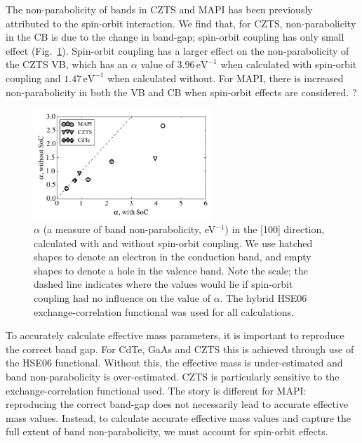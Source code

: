 The non-parabolicity of bands in CZTS\autocite{Ito2015} and MAPI\autocite{Brivio2014,Mosconi2017} has been previously attributed to the spin-orbit interaction. 
We find that, for CZTS, non-parabolicity in the CB is due to the change in band-gap; spin-orbit coupling has only small effect (Fig.\ \ref{alpha_SoC}). 
Spin-orbit coupling has a larger effect on the non-parabolicity of the CZTS VB, which has an $\alpha$ value of $3.96\,\textrm{eV}^{-1}$ when calculated with spin-orbit coupling and $1.47\,\textrm{eV}^{-1}$ when calculated without. 
For MAPI, there is increased non-parabolicity in both the VB and CB when spin-orbit effects are considered. 
?
\begin{figure}[tb] \centering
\includegraphics[width=0.6\textwidth]{./figures/ch4/alpha_SoC.png}
\caption[Band non-parabolicity and spin-orbit coupling]{\label{alpha_SoC}$\alpha$ (a measure of band non-parabolicity, eV$^{-1}$) in the [100] direction, calculated with and without spin-orbit coupling. We use hatched shapes to denote an electron in the conduction band, and empty shapes to denote a hole in the valence band. Note the scale; the dashed line indicates where the values would lie if spin-orbit coupling had no influence on the value of $\alpha$. The hybrid HSE06 exchange-correlation functional was used for all calculations. }
\end{figure}

To accurately calculate effective mass parameters, it is important to reproduce the correct band gap.
For CdTe, GaAs and CZTS this is achieved through use of the HSE06 functional.
Without this, the effective mass is under-estimated and band non-parabolicity is over-estimated.
CZTS is particularly sensitive to the exchange-correlation functional used.
The story is different for MAPI: 
reproducing the correct band-gap does not necessarily lead to accurate effective mass values.
Instead, to calculate accurate effective mass values and capture the full extent of band non-parabolicity, we must account for spin-orbit effects.

